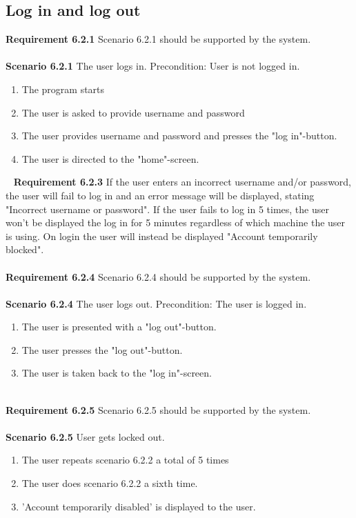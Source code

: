 \documentclass{article}
\begin{document}
\subsection{Log in and log out}
\textbf{Requirement 6.2.1} Scenario 6.2.1 should be supported by the system.
\\ \\
\textbf{Scenario 6.2.1} The user logs in. Precondition: User is not logged in. 
\begin{enumerate}
    \item The program starts
    \item The user is asked to provide username and password
    \item The user provides username and password and presses the "log in"-button.
    \item The user is directed to the "home"-screen.
\end{enumerate}
\mbox{}\
\textbf{Requirement 6.2.3} If the user enters an incorrect username and/or password, the user will fail to log in and an error message will be displayed, stating "Incorrect username or password". If the user fails to log in 5 times, the user won't be displayed the log in  for 5 minutes regardless of which machine the user is using. On login the user will instead be displayed "Account temporarily blocked".
\\ \\
\textbf{Requirement 6.2.4} Scenario 6.2.4 should be supported by the system.
\\ \\
\textbf{Scenario 6.2.4} The user logs out. Precondition: The user is logged in.
\begin{enumerate}
    \item The user is presented with a "log out"-button.
    \item The user presses the "log out"-button.
    \item The user is taken back to the "log in"-screen.
\end{enumerate}
\mbox{}\\
\textbf{Requirement 6.2.5} Scenario 6.2.5 should be supported by the system.
\\ \\
\textbf{Scenario 6.2.5} User gets locked out.
\begin{enumerate}
    \item The user repeats scenario 6.2.2 a total of 5 times
    \item The user does scenario 6.2.2 a sixth time.
    \item 'Account temporarily disabled' is displayed to the user.
\end{enumerate}
\end{document}
